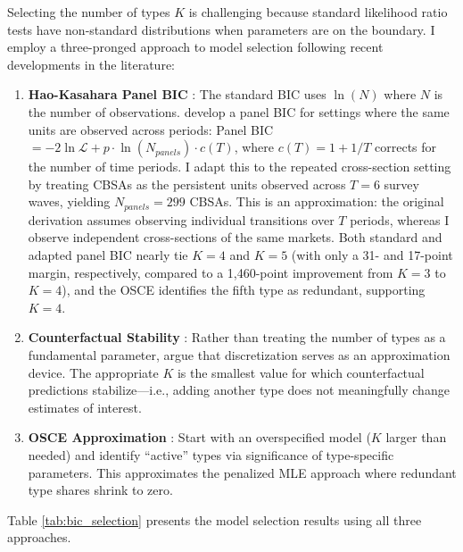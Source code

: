 \documentclass[12pt]{article}
\begin{document}
Selecting the number of types $K$ is challenging because standard likelihood ratio tests have non-standard distributions when parameters are on the boundary. I employ a three-pronged approach to model selection following recent developments in the literature:

\begin{enumerate}
    \item \textbf{Hao-Kasahara Panel BIC} \citep{hao2025}: The standard BIC uses $\ln(N)$ where $N$ is the number of observations. \citet{hao2025} develop a panel BIC for settings where the same units are observed across periods: Panel BIC $= -2\ln\mathcal{L} + p \cdot \ln(N_{panels}) \cdot c(T)$, where $c(T) = 1 + 1/T$ corrects for the number of time periods. I adapt this to the repeated cross-section setting by treating CBSAs as the persistent units observed across $T=6$ survey waves, yielding $N_{panels} = 299$ CBSAs. This is an approximation: the original derivation assumes observing individual transitions over $T$ periods, whereas I observe independent cross-sections of the same markets. Both standard and adapted panel BIC nearly tie $K=4$ and $K=5$ (with only a 31- and 17-point margin, respectively, compared to a 1,460-point improvement from $K=3$ to $K=4$), and the OSCE identifies the fifth type as redundant, supporting $K=4$.

    \item \textbf{Counterfactual Stability} \citep{bonhomme2022}: Rather than treating the number of types as a fundamental parameter, \citet{bonhomme2022} argue that discretization serves as an approximation device. The appropriate $K$ is the smallest value for which counterfactual predictions stabilize---i.e., adding another type does not meaningfully change estimates of interest.

    \item \textbf{OSCE Approximation} \citep{budanova2025}: Start with an overspecified model ($K$ larger than needed) and identify ``active'' types via significance of type-specific parameters. This approximates the penalized MLE approach where redundant type shares shrink to zero.
\end{enumerate}

Table \ref{tab:bic_selection} presents the model selection results using all three approaches.
\end{document}
